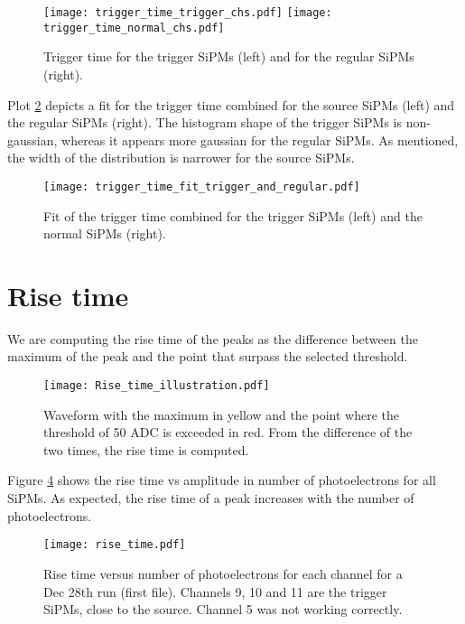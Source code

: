 \documentclass[11pt,a4paper,english,oneside, pdf]{article}
\begin{document}
	\begin{figure}[!h]
		\centering
		\texttt{[image: trigger\_time\_trigger\_chs.pdf]}
		\texttt{[image: trigger\_time\_normal\_chs.pdf]}
		\caption{Trigger time for the trigger SiPMs (left) and for the regular SiPMs (right).}
		\label{fig:trigger_time}
	\end{figure}

	
	Plot \ref{fig:trigger_time_fit_trigger_and_regular} depicts a fit for the trigger time combined for the source SiPMs (left) and the regular SiPMs (right). The histogram shape of the trigger SiPMs is non-gaussian, whereas it appears more gaussian for the regular SiPMs. As mentioned, the width of the distribution is narrower for the source SiPMs.
	
	\begin{figure}[!h]
		\begin{center}
			\texttt{[image: trigger\_time\_fit\_trigger\_and\_regular.pdf]}
			\caption{Fit of the trigger time combined for the trigger SiPMs (left) and the normal SiPMs (right).}
			\label{fig:trigger_time_fit_trigger_and_regular}
		\end{center}
	\end{figure}
	
	
	\section{Rise time}
	
	We are computing the rise time of the peaks as the difference between the maximum of the peak and the point that surpass the selected threshold.
	
	\begin{figure}[!h]
		\begin{center}
			\texttt{[image: Rise\_time\_illustration.pdf]}
			\caption{Waveform with the maximum in yellow and the point where the threshold of 50 ADC is exceeded in red. From the difference of the two times, the rise time is computed.}
			\label{fig:Rise_time_illustration}
		\end{center}
	\end{figure}
	
	Figure \ref{fig:rise_time} shows the rise time vs amplitude in number of photoelectrons for all SiPMs. As expected, the rise time of a peak increases with the number of photoelectrons.
	
	\begin{figure}[!h]
		\begin{center}
			\texttt{[image: rise\_time.pdf]}
			\caption{Rise time versus number of photoelectrons for each channel for a Dec 28th run (first file). Channels 9, 10 and 11 are the trigger SiPMs, close to the source. Channel 5 was not working correctly.}
			\label{fig:rise_time}
		\end{center}
	\end{figure}
	
\end{document}

